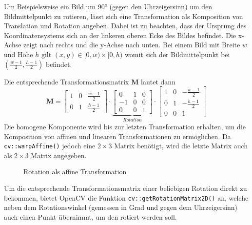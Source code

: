 \documentclass{whswinvcbook}
\begin{document}
Um Beispielsweise ein Bild um 90° (gegen den Uhrzeigersinn) um den Bildmittelpunkt zu rotieren, lässt sich eine Transformation als Komposition von Translation und Rotation angeben. Dabei ist zu beachten, dass der Ursprung des Koordinatensystems sich an der linkeren oberen Ecke des Bildes befindet. Die x-Achse zeigt nach rechts und die y-Achse nach unten. Bei einem Bild mit Breite $w$ und Höhe $h$ gilt $(x,y)\in[0,w)\times[0,h)$ womit sich der Bildmittelpunkt bei $(\frac{w-1}{2},\frac{h-1}{2})$ befindet.

Die entsprechende Transformationsmatrix $\mathbf{M}$ lautet dann $$\mathbf{M}=\begin{bmatrix}1&0&\frac{w-1}{2}\\0&1&\frac{h-1}{2}\end{bmatrix}\cdot\underbrace{\begin{bmatrix}0&1&0\\-1&0&0\\0&0&1\end{bmatrix}}_{Rotation}\cdot\begin{bmatrix}1&0&-\frac{w-1}{2}\\0&1&-\frac{h-1}{2}\\0&0&1\end{bmatrix}$$
Die homogene Komponente wird bis zur letzten Transformation erhalten, um die Komposition von affinen und linearen Transformationen zu ermöglichen. Da \texttt{cv::warpAffine()} jedoch eine $2\times3$ Matrix benötigt, wird die letzte Matrix auch als $2\times3$ Matrix angegeben.
\begin{figure}[H]
    \centering
    \quad\quad\quad\quad
    \caption{Rotation als affine Transformation}
    \label{fig-opencv-affine-1}
\end{figure}
Um die entsprechende Transformationsmatrix einer beliebigen Rotation direkt zu bekommen, bietet OpenCV die Funktion \texttt{cv::getRotationMatrix2D()} an, welche neben dem Rotationswinkel (gemessen in Grad und gegen dem Uhrzeigersinn) auch einen Punkt übernimmt, um den rotiert werden soll.
\end{document}
